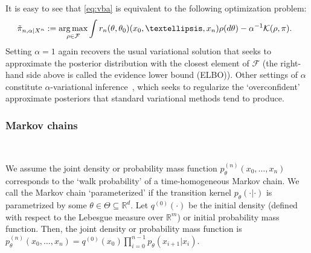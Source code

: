 \documentclass[11pt]{amsart}
\newcommand{\datas}{x_0,\dots,x_n}
\newtheorem{defn}{Definition}[section]
\begin{document}
It is easy to see that \cref{eq:vba} is equivalent to the following optimization problem:
\begin{align}~\label{eq:elbo}
    \Tilde{\pi}_{n,\alpha|X^n} & := \underset{\rho\in \mathcal{F}}{\arg \max}  \int r_n(\theta,\theta_0)(\datas) \rho({d\theta}) - \alpha^{-1} \mathcal{K}(\rho,\pi).
\end{align}
Setting $\alpha=1$ again recovers the usual variational solution that seeks to approximate the posterior distribution with the closest element of $\mathcal{F}$ (the right-hand side above is called the evidence lower bound (ELBO)).
Other settings of $\alpha$ constitute $\alpha$-variational inference~\citep{bhatta}, which seeks to regularize the `overconfident' approximate posteriors that standard variational methods tend to produce. %


\subsubsection{Markov chains}~\label{section:ergodicity}

We assume the joint density or probability mass function $p_{\theta}^{(n)}(\datas)$ corresponds to the `walk probability' of a time-homogeneous Markov chain. We call the Markov chain `parameterized' if the transition kernel $p_\theta(\cdot|\cdot)$ is parametrized by some $\theta \in \Theta \subseteq \mathbb R^d$. Let $q^{(0)}(\cdot)$ be the initial density (defined with respect to the Lebesgue measure over $\mathbb R^m$) or initial probability mass function. Then, the joint density or probability mass function is $p_{\theta}^{(n)}(\datas) = 
q^{(0)}(x_0) \prod_{i=0}^{n-1} p_{\theta}(x_{i+1}|x_i)$. 
\end{document}
